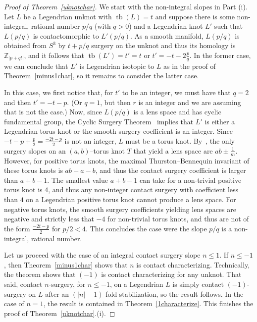 \documentclass[11pt]{amsart} %
\DeclareMathOperator{\tb}{tb}
\newcommand{\Z}{\mathbb{Z}}
\theoremstyle{plain}
\theoremstyle{definition}
\begin{document}
\begin{proof}[Proof of Theorem~\ref{uknotchar}]
	We start with the non-integral slopes in Part (i). Let $L$ be a Legendrian unknot with $\tb(L)=t$ and suppose there is some non-integral, rational number $p/q$ (with $q>0$) and a Legendrian knot $L'$ such that $L(p/q)$ is contactomorphic to $L'(p/q)$. As a smooth manifold, $L(p/q)$ is obtained from $S^3$ by $t+p/q$ surgery on the unknot and thus its homology is $\Z_{|p+qt|}$, and it follows that $\tb(L')=t'=t$ or $t'=-t-2\frac pq$. In the former case, we can conclude that $L'$ is Legendrian isotopic to $L$ as in the proof of Theorem~\ref{minus1char}, so it remains to consider the latter case. 
	
	In this case, we first notice that, for $t'$ to be an integer, we must have that $q=2$ and then $t'=-t-p$. (Or $q=1$, but then $r$ is an integer and we are assuming that is not the case.) Now, since $L(p/q)$ is a lens space and has cyclic fundamental group, the Cyclic Surgery Theorem~\cite{CullerGordonLueckeShalen87} implies that $L'$ is either a Legendrian torus knot or the smooth surgery coefficient is an integer. Since $-t-p+\frac p2=\frac{-2t-p}{2}$ is not an integer, $L$ must be a torus knot. By~\cite{Moser71}, the only surgery slopes on an $(a,b)$--torus knot $T$ that yield a lens space are $ab\pm \frac 1m$. However, for positive torus knots, the maximal Thurston--Bennequin invariant of these torus knots is $ab-a-b$, and thus the contact surgery coefficient is larger than $a+b-1$. The smallest value $a+b-1$ can take for a non-trivial positive torus knot is $4$, and thus any non-integer contact surgery with coefficient less than $4$ on a Legendrian positive torus knot cannot produce a lens space. For negative torus knots, the smooth surgery coefficients yielding lens spaces are negative and strictly less that $-4$ for non-trivial torus knots, and thus are not of the form $\frac{-2t-p}{2}$ for $p/2<4$. This concludes the case were the slope $p/q$ is a non-integral, rational number.
	
	Let us proceed with the case of an integral contact surgery slope $n\leq 1$. If $n\leq -1$, then Theorem~\ref{minus1char} shows that $n$ is contact characterizing. Technically, the theorem shows that $(-1)$ is contact characterizing for any unknot. That said, contact $n$-surgery, for $n\leq-1$, on a Legendrian $L$ is simply contact $(-1)$-surgery on $L$ after an $(|n|-1)$-fold stabilization, so the result follows. In the case of $n=1$, the result is contained in Theorem~\ref{1characterize}. This finishes the proof of Theorem~\ref{uknotchar}.(i).
	

\end{proof}
\end{document}
